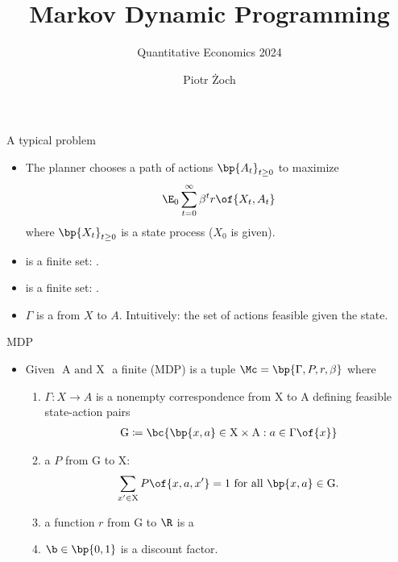 \documentclass[11pt,xcolor={dvipsnames},aspectratio=159,hyperref={pdftex,pdfpagemode=UseNone,hidelinks,pdfdisplaydoctitle=true},usepdftitle=false]{beamer}
\begin{document}
\title{Markov Dynamic Programming}
\subtitle{Quantitative Economics 2024}

\author{Piotr Żoch}%
\frame{\titlepage}

\begin{frame}{A typical problem}   
   
\begin{itemize}
    \item The planner chooses a path of actions $\bp{A_t}_{t\geq0}$ to maximize 
    \begin{align*}
         \E_0 \sum_{t=0}^\infty \beta^t r\of{X_t,A_t} 
    \end{align*}
    where $\bp{X_t}_{t\geq0}$ is a state process ($X_0$ is given).
    \item {} is a finite set: .
    \item {} is a finite set: .
    \item $\Gamma$ is a  from $X$ to $A$. Intuitively: the set of actions feasible given the state.
\end{itemize}
\end{frame}

\begin{frame}{MDP}   
 \begin{itemize}
    \item Given $\text{ A and X }$ a finite  (MDP) is a tuple $ \Mc = \bp{\Gamma,P,r,\beta}$ where
    \begin{enumerate}
        \item $\Gamma: X \to A$ is a nonempty correspondence from $\text{X}$ to $\text{A}$ defining feasible state-action pairs \begin{align*}
            \text{G} \coloneq \bc{\bp{x,a} \in \text{X} \times \text{A}: a \in \Gamma\of{x}}
        \end{align*}
        \item a  $P$ from $\text{G}$ to $\text{X}$: \begin{align*}
            \sum_{x^\prime \in \text{X}} P\of{x,a,x^\prime} = 1 \text{ for all } \bp{x,a} \in \text{G}.
        \end{align*}
        \item a function $r$ from $\text{G}$ to $\R$ is a 
        \item $\b \in \bp{0,1}$ is a discount factor.
    \end{enumerate}
\end{itemize}
\end{frame}
\end{document}
